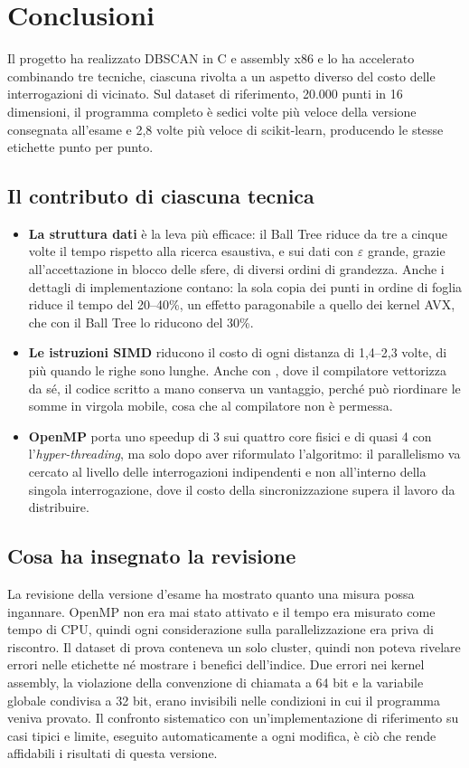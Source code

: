 \chapter{Conclusioni}

Il progetto ha realizzato DBSCAN in C e assembly x86 e lo ha accelerato combinando tre tecniche, ciascuna rivolta a un aspetto diverso del costo delle interrogazioni di vicinato. Sul dataset di riferimento, 20.000 punti in 16 dimensioni, il programma completo è sedici volte più veloce della versione consegnata all'esame e 2,8 volte più veloce di scikit-learn, producendo le stesse etichette punto per punto.

\section*{Il contributo di ciascuna tecnica}

\begin{itemize}
    \item \textbf{La struttura dati} è la leva più efficace: il Ball Tree riduce da tre a cinque volte il tempo rispetto alla ricerca esaustiva, e sui dati con $\varepsilon$ grande, grazie all'accettazione in blocco delle sfere, di diversi ordini di grandezza. Anche i dettagli di implementazione contano: la sola copia dei punti in ordine di foglia riduce il tempo del 20--40\%, un effetto paragonabile a quello dei kernel AVX, che con il Ball Tree lo riducono del 30\%.
    \item \textbf{Le istruzioni SIMD} riducono il costo di ogni distanza di 1,4--2,3 volte, di più quando le righe sono lunghe. Anche con , dove il compilatore vettorizza da sé, il codice scritto a mano conserva un vantaggio, perché può riordinare le somme in virgola mobile, cosa che al compilatore non è permessa.
    \item \textbf{OpenMP} porta uno speedup di 3 sui quattro core fisici e di quasi 4 con l'\emph{hyper-threading}, ma solo dopo aver riformulato l'algoritmo: il parallelismo va cercato al livello delle interrogazioni indipendenti e non all'interno della singola interrogazione, dove il costo della sincronizzazione supera il lavoro da distribuire.
\end{itemize}

\section*{Cosa ha insegnato la revisione}

La revisione della versione d'esame ha mostrato quanto una misura possa ingannare. OpenMP non era mai stato attivato e il tempo era misurato come tempo di CPU, quindi ogni considerazione sulla parallelizzazione era priva di riscontro. Il dataset di prova conteneva un solo cluster, quindi non poteva rivelare errori nelle etichette né mostrare i benefici dell'indice. Due errori nei kernel assembly, la violazione della convenzione di chiamata a 64 bit e la variabile globale condivisa a 32 bit, erano invisibili nelle condizioni in cui il programma veniva provato. Il confronto sistematico con un'implementazione di riferimento su casi tipici e limite, eseguito automaticamente a ogni modifica, è ciò che rende affidabili i risultati di questa versione.

